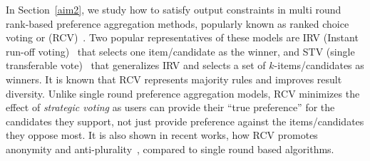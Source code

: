 \documentclass[11pt]{article}
\begin{document}


\smallskip \noindent In Section~\ref{aim2}, we study how to satisfy output constraints in multi round rank-based preference aggregation methods, popularly known as ranked choice voting or (RCV)~\cite{irv1}. Two popular representatives of these models are IRV (Instant run-off voting)~\cite{irv1} that selects one item/candidate as the winner, and STV (single transferable vote)~\cite{stv-irv, stv1} that generalizes IRV and selects a set of $k$-items/candidates as winners.  It is known that RCV represents majority rules and improves result diversity. Unlike single round preference aggregation models, RCV minimizes the effect of {\em strategic voting} as users can provide their ``true preference'' for the candidates they support, not just provide preference against the items/candidates they oppose most. It is also shown in recent works, how RCV promotes anonymity and anti-plurality~\cite{stv-irv}, compared to single round based algorithms.
\end{document}

